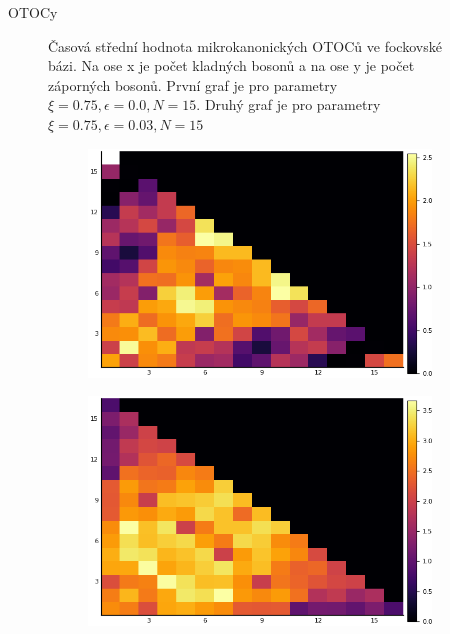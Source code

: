 \documentclass{article}
\begin{document}
\begin{section}{OTOCy}
\begin{figure}[H]
\begin{subfigure}{.5\textwidth}
                    \end{subfigure}
                    \caption{Časová střední hodnota mikrokanonických OTOCů ve fockovské bázi. Na ose x je počet kladných bosonů a na 
                    ose y je počet záporných bosonů. První graf je pro parametry $\xi = 0.75, \epsilon = 0.0, N = 15$.
                    Druhý graf je pro parametry $\xi = 0.75, \epsilon = 0.03, N = 15$}
                    \end{figure}

                    \begin{figure}[H]
                        \begin{subfigure}{.5\textwidth}
                          \centering
                          \includegraphics[width=1.0\linewidth]{HMD0.png}
                         
                        \end{subfigure}%
                        \begin{subfigure}{.5\textwidth}
                          \centering
                          \includegraphics[width=1.0\linewidth]{HMD0.03.png}
                          

\end{subfigure}
\end{figure}
\end{section}
\end{document}
